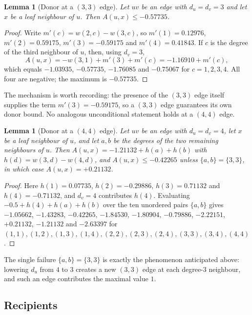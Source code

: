 \documentclass[11pt,a4paper]{article}
\theoremstyle{plain}
\newtheorem{lemma}[theorem]{Lemma}
\theoremstyle{definition}
\theoremstyle{remark}
\begin{document}
\begin{lemma}[Donor at a $(3,3)$ edge]
\label{lem:donorE}
Let $uv$ be an edge with $d_u=d_v=3$ and let $x$ be a leaf neighbour of $u$.
Then $A(u,x)\le-0.57735$.
\end{lemma}

\begin{proof}
Write $m'(c)=w(2,c)-w(3,c)$, so $m'(1)=0.12976$, $m'(2)=0.59175$,
$m'(3)=-0.59175$ and $m'(4)=0.41843$. If $c$ is the degree of the third
neighbour of $u$, then, using $d_v=3$,
\[
  A(u,x)=-w(3,1)+m'(3)+m'(c)=-1.16910+m'(c),
\]
which equals $-1.03935$, $-0.57735$, $-1.76085$ and $-0.75067$ for $c=1,2,3,4$.
All four are negative; the maximum is $-0.57735$.
\end{proof}

The mechanism is worth recording: the presence of the $(3,3)$ edge itself
supplies the term $m'(3)=-0.59175$, so a $(3,3)$ edge guarantees its own donor
bound. No analogous unconditional statement holds at a $(4,4)$ edge.

\begin{lemma}[Donor at a $(4,4)$ edge]
\label{lem:donorC}
Let $uv$ be an edge with $d_u=d_v=4$, let $x$ be a leaf neighbour of $u$, and let
$a,b$ be the degrees of the two remaining neighbours of $u$. Then
$A(u,x)=-1.21132+h(a)+h(b)$ with $h(d)=w(3,d)-w(4,d)$, and $A(u,x)\le-0.42265$
unless $\{a,b\}=\{3,3\}$, in which case $A(u,x)=+0.21132$.
\end{lemma}

\begin{proof}
Here $h(1)=0.07735$, $h(2)=-0.29886$, $h(3)=0.71132$ and $h(4)=-0.71132$, and
$d_v=4$ contributes $h(4)$. Evaluating $-0.5+h(4)+h(a)+h(b)$ over the ten
unordered pairs $\{a,b\}$ gives $-1.05662$, $-1.43283$, $-0.42265$, $-1.84530$,
$-1.80904$, $-0.79886$, $-2.22151$, $+0.21132$, $-1.21132$ and $-2.63397$ for
$(1,1),(1,2),(1,3),(1,4),(2,2),(2,3),(2,4),(3,3),(3,4),(4,4)$.
\end{proof}

The single failure $\{a,b\}=\{3,3\}$ is exactly the phenomenon anticipated above:
lowering $d_u$ from $4$ to $3$ creates a new $(3,3)$ edge at each degree-$3$
neighbour, and such an edge contributes the maximal value $1$.

\subsection*{Recipients}
\end{document}
